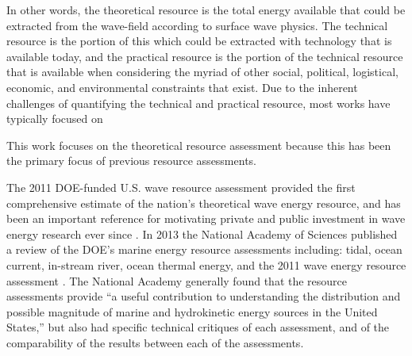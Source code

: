 In other words, the theoretical resource is the total energy available that
could be extracted from the wave-field according to surface wave physics. The
technical resource is the portion of this which could be extracted with
technology that is available today, and the practical resource is the portion
of the technical resource that is available when considering the myriad of other social, political, logistical,
economic, and environmental constraints that exist. Due to the inherent challenges of
quantifying the technical and practical resource, most works have typically
focused on 

This work focuses on the theoretical resource assessment because this has been
the primary focus of previous resource assessments.


The 2011 DOE-funded U.S. wave resource assessment provided the first
comprehensive estimate of the nation’s theoretical wave energy resource, and has been an
important reference for motivating private and public investment in wave energy
research ever since \citep[]{EPRIwaveresource2011}. In 2013 the National Academy of Sciences published a
review of the DOE’s marine energy resource assessments including: tidal, ocean
current, in-stream river, ocean thermal energy, and the 2011 wave energy
resource assessment \citep{nationalresearchcouncilEvaluationDepartmentEnergy2013}. The National Academy generally found that the resource
assessments provide “a useful contribution to understanding the distribution and
possible magnitude of marine and hydrokinetic energy sources in the United
States,” but also had specific technical critiques of each assessment, and of
the comparability of the results between each of the assessments.

